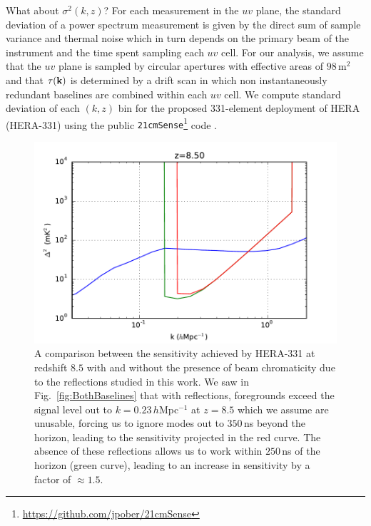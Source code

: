\documentclass[twocolumn]{emulateapj}
\begin{document}
What about $\sigma^2(k,z)$? For each measurement in the $uv$ plane, the standard deviation of a power spectrum measurement is given by the direct sum of sample variance and thermal noise \citep{McQuinn:2006} which in turn depends on the primary beam of the instrument and the time spent sampling each $uv$ cell. For our analysis, we assume that the $uv$ plane is sampled by circular apertures with effective areas of $98$\,m$^2$ and that $\tau({\bf k})$ is determined by a drift scan in which non instantaneously redundant baselines are combined within each $uv$ cell. We compute standard deviation of each $(k,z)$ bin for the proposed 331-element deployment of HERA (HERA-331) using the public {\tt 21cmSense}\footnote{\url{https://github.com/jpober/21cmSense}} code \citep{Pober:2013b,Pober:2014}. 


\begin{figure}
\includegraphics[width=.5\textwidth]{figures/sensitivity_comparison_v2.pdf}
\caption{A comparison between the sensitivity achieved by HERA-331 at redshift $8.5$ with and without the presence of beam chromaticity due to the reflections studied in this work. We saw in Fig.~\ref{fig:BothBaselines} that with reflections, foregrounds exceed the signal level out to $k=0.23$\,$h$Mpc$^{-1}$ at $z=8.5$ which we assume are unusable, forcing us to ignore modes out to $350$\,ns beyond the horizon, leading to the sensitivity projected in the red curve. The absence of these reflections allows us to work within $250$\,ns of the horizon (green curve), leading to an increase in sensitivity by a factor of $\approx 1.5$. }
\label{fig:Sensitivity}
\end{figure}
\end{document}
